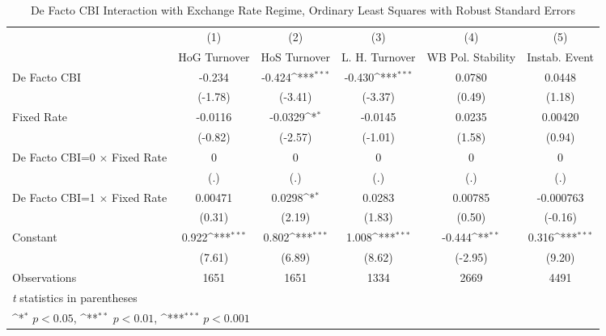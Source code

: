 \begin{table}[htbp]\centering
\def\sym#1{\ifmmode^{#1}\else\(^{#1}\)\fi}
\caption{De Facto CBI Interaction with Exchange Rate Regime, Ordinary Least Squares with Robust Standard Errors \label{imultIndOLSDF}}
\begin{tabular}{l*{5}{c}}
\toprule
                                        &\multicolumn{1}{c}{(1)}&\multicolumn{1}{c}{(2)}&\multicolumn{1}{c}{(3)}&\multicolumn{1}{c}{(4)}&\multicolumn{1}{c}{(5)}\\
                                        &\multicolumn{1}{c}{HoG Turnover}&\multicolumn{1}{c}{HoS Turnover}&\multicolumn{1}{c}{L. H. Turnover}&\multicolumn{1}{c}{WB Pol. Stability}&\multicolumn{1}{c}{Instab. Event}\\
\midrule
De Facto CBI                            &   -0.234         &   -0.424\sym{***}&   -0.430\sym{***}&   0.0780         &   0.0448         \\
                                        &  (-1.78)         &  (-3.41)         &  (-3.37)         &   (0.49)         &   (1.18)         \\
\addlinespace
Fixed Rate                              &  -0.0116         &  -0.0329\sym{*}  &  -0.0145         &   0.0235         &  0.00420         \\
                                        &  (-0.82)         &  (-2.57)         &  (-1.01)         &   (1.58)         &   (0.94)         \\
\addlinespace
De Facto CBI=0 $\times$ Fixed Rate      &        0         &        0         &        0         &        0         &        0         \\
                                        &      (.)         &      (.)         &      (.)         &      (.)         &      (.)         \\
\addlinespace
De Facto CBI=1 $\times$ Fixed Rate      &  0.00471         &   0.0298\sym{*}  &   0.0283         &  0.00785         &-0.000763         \\
                                        &   (0.31)         &   (2.19)         &   (1.83)         &   (0.50)         &  (-0.16)         \\
\addlinespace
Constant                                &    0.922\sym{***}&    0.802\sym{***}&    1.008\sym{***}&   -0.444\sym{**} &    0.316\sym{***}\\
                                        &   (7.61)         &   (6.89)         &   (8.62)         &  (-2.95)         &   (9.20)         \\
\midrule
Observations                            &     1651         &     1651         &     1334         &     2669         &     4491         \\
\bottomrule
\multicolumn{6}{l}{\footnotesize \textit{t} statistics in parentheses}\\
\multicolumn{6}{l}{\footnotesize \sym{*} \(p<0.05\), \sym{**} \(p<0.01\), \sym{***} \(p<0.001\)}\\
\end{tabular}
\end{table}
